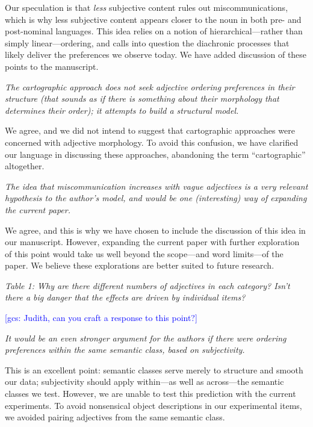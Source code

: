 \documentclass[12pt]{article}
\newcommand{\gcs}[1]{\textcolor{blue}{[gcs: #1]}}
\begin{document}
Our speculation is that \emph{less} subjective content rules out miscommunications, which is why less subjective content appears closer to the noun in both pre- and post-nominal languages. This idea relies on a notion of hierarchical---rather than simply linear---ordering, and calls into question the diachronic processes that likely deliver the preferences we observe today. We have added discussion of these points to the manuscript.

\item \emph{The cartographic approach does not seek adjective ordering preferences in their structure (that sounds as if there is something about their morphology that determines their order); it attempts to build a structural model.}

We agree, and we did not intend to suggest that cartographic approaches were concerned with adjective morphology. To avoid this confusion, we have clarified our language in discussing these approaches, abandoning the term ``cartographic'' altogether.

\item \emph{The idea that miscommunication increases with vague adjectives is a very relevant hypothesis to the author's model, and would be one (interesting) way of expanding the current paper.}

We agree, and this is why we have chosen to include the discussion of this idea in our manuscript. However, expanding the current paper with further exploration of this point would take us well beyond the scope---and word limits---of the paper. We believe these explorations are better suited to future research.

\item \emph{Table 1: Why are there different numbers of adjectives in each category? Isn't there a big danger that the effects are driven by individual items?}

\gcs{Judith, can you craft a response to this point?}

\item \emph{It would be an even stronger argument for the authors if there were ordering preferences within the same semantic class, based on subjectivity.}

This is an excellent point: semantic classes serve merely to structure and smooth our data; subjectivity should apply within---as well as across---the semantic classes we test. However, we are unable to test this prediction with the current experiments. To avoid nonsensical object descriptions in our experimental items, we avoided pairing adjectives from the same semantic class.
\end{document}
